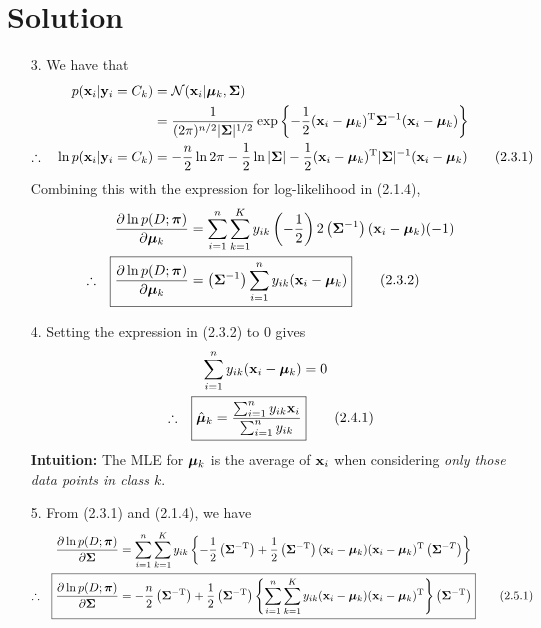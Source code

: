 \documentclass[submit]{../harvardml}
\newenvironment{solution}
  {\color{blue}\section*{Solution}}
{}
\begin{document}
\begin{solution}
\begin{enumerate}
    \item[3.] We have that
    \begin{align*}
        p(\mathbf{x}_i | \mathbf{y}_i = C_k) &= \mathcal{N}(\mathbf{x}_i | \boldsymbol{\mu}_k, \mathbf{\Sigma}) \\
        &= \frac{1}{(2\pi)^{n/2}|\mathbf{\Sigma}|^{1/2}}\exp \left\{ -\frac{1}{2}(\mathbf{x}_i - \boldsymbol{\mu}_k)^{\mathrm{T}} \mathbf{\Sigma}^{-1} (\mathbf{x}_i - \boldsymbol{\mu}_k) \right\} \\
        \therefore \quad \ln p(\mathbf{x}_i | \mathbf{y}_i = C_k) &= -\frac{n}{2}\ln 2\pi - \frac{1}{2} \ln |\mathbf{\Sigma}| - \frac{1}{2} (\mathbf{x}_i - \boldsymbol{\mu}_k)^{\mathrm{T}} |\mathbf{\Sigma}|^{-1} (\mathbf{x}_i - \boldsymbol{\mu}_k) \tag*{(2.3.1)}
    \end{align*}
    Combining this with the expression for log-likelihood in (2.1.4),
    \begin{align*}
        \frac{\partial \ln p(D; \bpi)}{\partial \bmu_k} &= \sum_{i=1}^n \sum_{k=1}^K y_{ik}\left(-\frac{1}{2}\right)2\left(\bSigma^{-1}\right)(\boldx_i - \bmu_k)(-1) \\
        \therefore \quad \Aboxed{ \frac{\partial \ln p(D; \bpi)}{\partial \bmu_k} &= \left(\bSigma^{-1}\right)\sum_{i=1}^n y_{ik} (\boldx_i - \bmu_k) } \tag*{(2.3.2)}
    \end{align*}
    \item[4.] Setting the expression in (2.3.2) to 0 gives
    \begin{align*}
        \sum_{i=1}^n y_{ik}(\boldx_i - \bmu_k) &= 0 \\
        \therefore \quad \Aboxed{ \hat{\bmu}_k = \frac{\sum_{i=1}^n y_{ik}\boldx_i}{\sum_{i=1}^n y_{ik}} } \tag*{(2.4.1)}
    \end{align*}
    \textbf{Intuition:} The MLE for $\boldsymbol{\mu}_k$ is the average of $\mathbf{x}_i$ when considering \textit{only those data points in class $k$}.

    \item[5.] From (2.3.1) and (2.1.4), we have
    \begin{align*}
        \frac{\partial \ln p(D; \bpi)}{\partial \bSigma} &= \sum_{i=1}^n \sum_{k=1}^K y_{ik} \left\{ -\frac{1}{2}\left(\bSigma^{-\mathrm{T}}\right) + \frac{1}{2}\left(\bSigma^{-\mathrm{T}}\right) (\boldx_i - \bmu_k)(\boldx_i - \bmu_k)^\mathrm{T}\left(\bSigma^{-T}\right) \right\} \\
        \therefore \quad \Aboxed{ \frac{\partial \ln p(D; \bpi)}{\partial \bSigma} &= -\frac{n}{2}\left(\bSigma^{-\mathrm{T}}\right) + \frac{1}{2}\left(\bSigma^{-\mathrm{T}}\right)\left\{ \sum_{i=1}^n\sum_{k=1}^K y_{ik} (\boldx_i - \bmu_k)(\boldx_i - \bmu_k)^\mathrm{T} \right\}\left(\bSigma^{-\mathrm{T}}\right) } \tag*{(2.5.1)}
    \end{align*}


\end{enumerate}
\end{solution}
\end{document}
